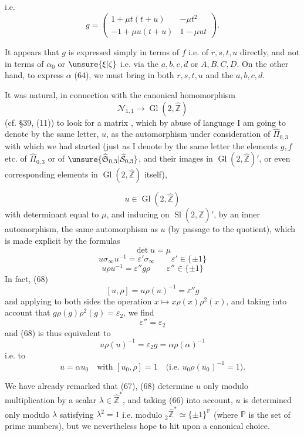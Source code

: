 i.e.
\[
\tag{65}
g=\begin{pmatrix}1+\mu t(t+u)&-\mu t^2\\-1+\mu u(t+u)&1-\mu ut\end{pmatrix}.
\]

It appears that $g$ is expressed simply in terms of $f$ i.e. of $r,s,t,u$ directly, and not in terms of $\alpha_0$ or $\unsure{\xi|\zeta}$ i.e. via the $a,b,c,d$ or $A,B,C,D$. On the other hand, to express $\alpha$ (64), we must bring in both  $r,s,t,u$ and the $a,b,c,d$.

It was natural, in connection with the canonical homomorphism
\[
\mathcal N_{1,1}\longrightarrow\operatorname{Gl}(2,\widehat{\mathbb Z})
\]
(cf. \S39, (11)) to look for a matrix , which by abuse of language I am going to denote by the same letter, $u$, as the automorphism under consideration of $\widehat\Pi_{0,3}$ with which we had started (just as I denote by the same letter the elements $g,f$ etc. of $\widehat\Pi_{0,3}$ or of $\unsure{\widehat{\mathfrak S}_{0,3}|\widehat{\mathcal S}_{0,3}}$, and their images in $\operatorname{Gl}(2,\widehat{\mathbb Z})'$, or even corresponding elements in $\operatorname{Gl}(2,\widehat{\mathbb Z})$ itself),

\[
u\in\operatorname{Gl}(2,\widehat{\mathbb Z})
\]
 with determinant equal to $\mu$, and inducing on $\operatorname{Sl}(2,\widehat{\mathbb Z})'$, by an inner automorphism, the same automorphism as  $u$  (by passage to the quotient), which is made explicit by the formulas
\[
\tag{66}\det u=\mu
\]
\[
\tag{67}u\sigma_\infty u^{-1}=\varepsilon'\sigma_\infty\qquad\varepsilon'\in\{\pm1\}
\]
\[
\tag{68}u\rho u^{-1}=\varepsilon''g\rho\qquad\varepsilon''\in\{\pm1\}
\]
In fact,  (68)  
\[
[u,\rho]=u\rho(u)^{-1}=\varepsilon''g
\]
and applying to both sides the operation $x\mapsto x\rho(x)\rho^2(x)$, and taking into account that $g\rho(g)\rho^2(g)=\varepsilon_2$,   we find
\[
\tag{68 bis}\varepsilon''=\varepsilon_2
\]
and (68) is thus equivalent to
\[
u\rho(u)^{-1}=\varepsilon_2g=\alpha\rho(\alpha)^{-1}
\]
 i.e. to
\[
\tag{69}u=\alpha u_0\quad\text{with }[u_0,\rho]=1
\quad\bigl(\text{i.e. }u_0\rho(u_0)^{-1}=1\bigr).
\]

We have already remarked that (67), (68) determine $u$ only modulo multiplication by a scalar $\lambda\in\widehat{\mathbb Z}^*$, and taking (66) into account, $u$ is determined only modulo $\lambda$ satisfying $\lambda^2=1$ i.e. modulo ${}_2\widehat{\mathbb Z}^*\simeq\{\pm1\}^{\mathbb P}$ (where $\mathbb P$ is the set of prime numbers), but we nevertheless hope to hit upon a canonical choice.

